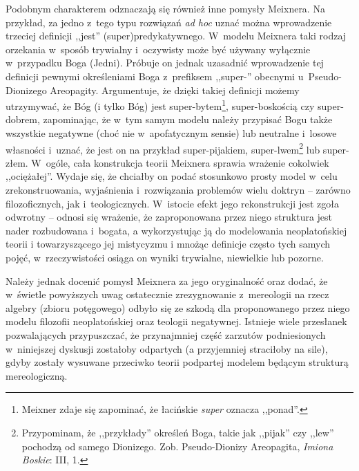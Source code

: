 Podobnym charakterem odznaczają się również inne pomysły Meixnera. Na przykład, za jedno z~tego typu rozwiązań \textit{ad hoc} uznać można wprowadzenie trzeciej definicji ,,jest'' (super)predykatywnego. W~modelu Meixnera taki rodzaj orzekania w~sposób trywialny i~oczywisty może być używany wyłącznie w~przypadku Boga (Jedni). Próbuje on jednak uzasadnić wprowadzenie tej definicji pewnymi określeniami Boga z~prefiksem ,,super-'' obecnymi u~Pseudo-Dionizego Areopagity. Argumentuje, że dzięki takiej definicji możemy utrzymywać, że Bóg (i tylko Bóg) jest super-bytem\footnote{Meixner zdaje się zapominać, że łacińskie \textit{super} oznacza ,,ponad''.}, super-boskością czy super-dobrem, zapominając, że w~tym samym modelu należy przypisać Bogu także wszystkie negatywne (choć nie w~apofatycznym sensie) lub neutralne i~losowe własności i~uznać, że jest on na przykład super-pijakiem, super-lwem\footnote{Przypominam, że ,,przykłady'' określeń Boga, takie jak ,,pijak'' czy ,,lew'' pochodzą od samego Dionizego. Zob. Pseudo-Dionizy Areopagita, \textit{Imiona Boskie}: III, 1.} lub super-złem. W~ogóle, cała konstrukcja teorii Meixnera sprawia wrażenie cokolwiek ,,ociężałej''. Wydaje się, że chciałby on podać stosunkowo prosty model w~celu zrekonstruowania, wyjaśnienia i~rozwiązania problemów wielu doktryn -- zarówno filozoficznych, jak i~teologicznych. W~istocie efekt jego rekonstrukcji jest zgoła odwrotny -- odnosi się wrażenie, że zaproponowana przez niego struktura jest nader rozbudowana i~bogata, a wykorzystując ją do modelowania neoplatońskiej teorii i towarzyszącego jej mistycyzmu i mnożąc definicje często tych samych pojęć, w~rzeczywistości osiąga on wyniki trywialne, niewielkie lub pozorne.

Należy jednak docenić pomysł Meixnera za jego oryginalność oraz dodać, że w~świetle powyższych uwag ostatecznie zrezygnowanie z~mereologii na rzecz algebry (zbioru potęgowego) odbyło się ze szkodą dla proponowanego przez niego modelu filozofii neoplatońskiej oraz teologii negatywnej. Istnieje wiele przesłanek pozwalających przypuszczać, że przynajmniej część zarzutów podniesionych w~niniejszej dyskusji zostałoby odpartych (a przyjemniej straciłoby na sile), gdyby zostały wysuwane przeciwko teorii podpartej modelem będącym strukturą mereologiczną.


